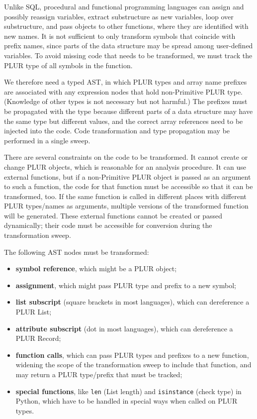 \documentclass[10pt, conference, compsocconf]{IEEEtran}
\begin{document}
Unlike SQL, procedural and functional programming languages can assign and possibly reassign variables, extract substructure as new variables, loop over substructure, and pass objects to other functions, where they are identified with new names. It is not sufficient to only transform symbols that coincide with prefix names, since parts of the data structure may be spread among user-defined variables. To avoid missing code that needs to be transformed, we must track the PLUR type of all symbols in the function.

We therefore need a typed AST, in which PLUR types and array name prefixes are associated with any expression nodes that hold non-Primitive PLUR type. (Knowledge of other types is not necessary but not harmful.) The prefixes must be propagated with the type because different parts of a data structure may have the same type but different values, and the correct array references need to be injected into the code. Code transformation and type propagation may be performed in a single sweep.

There are several constraints on the code to be transformed. It cannot create or change PLUR objects, which is reasonable for an analysis procedure. It can use external functions, but if a non-Primitive PLUR object is passed as an argument to such a function, the code for that function must be accessible so that it can be transformed, too. If the same function is called in different places with different PLUR types/names as arguments, multiple versions of the transformed function will be generated. These external functions cannot be created or passed dynamically; their code must be accessible for conversion during the transformation sweep.

The following AST nodes must be transformed:
\begin{itemize}
\item {\bf symbol reference}, which might be a PLUR object;
\item {\bf assignment}, which might pass PLUR type and prefix to a new symbol;
\item {\bf list subscript} (square brackets in most languages), which can dereference a PLUR List;
\item {\bf attribute subscript} (dot in most languages), which can dereference a PLUR Record;
\item {\bf function calls}, which can pass PLUR types and prefixes to a new function, widening the scope of the transformation sweep to include that function, and may return a PLUR type/prefix that must be tracked;
\item {\bf special functions}, like {\tt len} (List length) and {\tt isinstance} (check type) in Python, which have to be handled in special ways when called on PLUR types.
\end{itemize}
\end{document}

